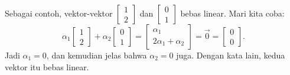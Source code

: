 Sebagai contoh, vektor-vektor
$\left[ \begin{smallmatrix} 1 \\ 2 \end{smallmatrix} \right]$
dan
$\left[ \begin{smallmatrix} 0 \\ 1 \end{smallmatrix} \right]$
bebas linear. Mari kita coba:
\begin{equation*}
\alpha_1
\begin{bmatrix} 1 \\ 2 \end{bmatrix}
+
\alpha_2
\begin{bmatrix} 0 \\ 1 \end{bmatrix}
=
\begin{bmatrix} \alpha_1 \\ 2 \alpha_1 + \alpha_2 \end{bmatrix}
=
\vec{0} =
\begin{bmatrix} 0 \\ 0 \end{bmatrix} .
\end{equation*}
Jadi $\alpha_1 = 0$, dan kemudian jelas bahwa $\alpha_2 = 0$ juga. Dengan
kata lain, kedua vektor itu bebas linear.

